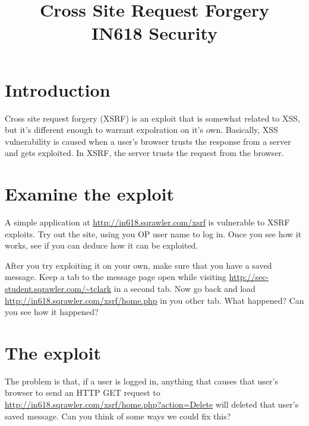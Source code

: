\documentclass{article}
\begin{document}
\title{Cross Site Request Forgery\\ IN618 Security}
\date{}
\maketitle

\section*{Introduction}
Cross site request forgery (XSRF) is an exploit that is somewhat related to XSS,
but it's different enough to warrant expolration on it's own.  Basically,
XSS vulnerability is caused when a user's browser trusts the response from a
server and gets exploited.  In XSRF, the server trusts the request from the 
browser.

\section{Examine the exploit}
A simple application at \url{http://in618.sqrawler.com/xsrf} is vulnerable
to XSRF exploits. Try out the site, using you OP user name to log in. Once you
see how it works, see if you can deduce how it can be exploited. 

After you try exploiting it on your own, make sure that you have a saved 
message. Keep a tab to the message page open while visiting 
\url{http://sec-student.sqrawler.com/~tclark} in a second tab.  Now go back
and load \url{http://in618.sqrawler.com/xsrf/home.php} in you other tab.
What happened?  Can you see how it happened?

\newpage

\section{The exploit}
The problem is that, if a user is logged in, anything that causes that user's
browser to send an HTTP GET request to \url{http://in618.sqrawler.com/xsrf/home.php?action=Delete} will deleted that user's saved message.  Can you think of some 
ways we could fix this?
\end{document}
